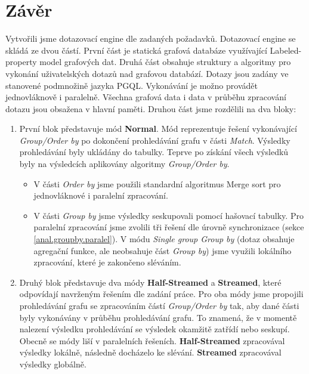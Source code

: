 \chapter*{Závěr}

Vytvořili jsme dotazovací engine dle zadaných požadavků.
Dotazovací engine se skládá ze dvou částí.
První část je statická grafová databáze využívající Labeled-property model grafových dat. 
Druhá část obsahuje struktury a algoritmy pro vykonání uživatelských dotazů nad grafovou databází.
Dotazy jsou zadány ve stanovené podmnožině jazyka PGQL.
Vykonávání je možno provádět jednovláknově i paralelně.
Všechna grafová data i data v průběhu zpracování dotazu jsou obsažena v hlavní paměti.
Druhou část jsme rozdělili na dva bloky:
\begin{enumerate}
\item
První blok představuje mód \textbf{Normal}.
Mód reprezentuje řešení vykonávající \textit{Group/Order by} po dokončení prohledávání grafu v části \textit{Match}.
Výsledky prohledávání byly ukládány do tabulky.
Teprve po získání všech výsledků byly na výsledcích aplikovány algoritmy \textit{Group/Order by}.
\begin{itemize}
\item V části \textit{Order by} jsme použili standardní algoritmus Merge sort pro jednovláknové i paralelní zpracování.
\item V části \textit{Group by} jsme výsledky seskupovali pomocí hašovací tabulky.
Pro paralelní zpracování jsme zvolili tři řešení dle úrovně synchronizace (sekce \ref{anal.groupby.paralel}).
V módu \textit{Single group Group by} (dotaz obsahuje agregační funkce, ale neobsahuje část \textit{Group by}) jsme využili lokálního zpracování, které je zakončeno sléváním.
\end{itemize}

\item
Druhý blok představuje dva módy \textbf{Half-Streamed} a \textbf{Streamed}, které odpovídají navrženým řešením dle zadání práce.
Pro oba módy jsme propojili prohledávání grafu se zpracováním částí \textit{Group/Order by} tak, aby dané části byly vykonávány v průběhu prohledávání grafu.
To znamená, že v momentě nalezení výsledku prohledávání se výsledek okamžitě zatřídí nebo seskupí.
Obecně se módy liší v paralelních řešeních. 
\textbf{Half-Streamed} zpracovával výsledky lokálně, následně docházelo ke slévání.
\textbf{Streamed} zpracovával výsledky globálně.
\begin{itemize}


\end{itemize}
\end{enumerate}
